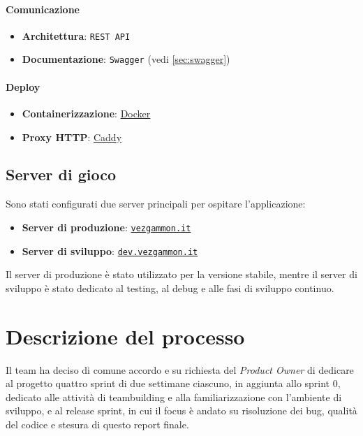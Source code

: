 \documentclass{article}
\begin{document}
\paragraph{Comunicazione}
\begin{itemize}
    \item \textbf{Architettura}: \texttt{REST API}
    \item \textbf{Documentazione}: \texttt{Swagger} (vedi \ref{sec:swagger})
\end{itemize}

\paragraph{Deploy}
\begin{itemize}
    \item \textbf{Containerizzazione}: \href{https://github.com/docker}{Docker}
    \item \textbf{Proxy HTTP}: \href{https://github.com/caddyserver/caddy}{Caddy}
\end{itemize}

\subsection{Server di gioco}

Sono stati configurati due server principali per ospitare l'applicazione:
\begin{itemize}
    \item \textbf{Server di produzione}: \href{https://vezgammon.it}{\texttt{vezgammon.it}}
    \item \textbf{Server di sviluppo}: \href{https://dev.vezgammon.it}{\texttt{dev.vezgammon.it}}
\end{itemize}
Il server di produzione è stato utilizzato per la versione stabile, mentre il server di sviluppo è stato dedicato al testing, 
al debug e alle fasi di sviluppo continuo.

\section{Descrizione del processo}

Il team ha deciso di comune accordo e su richiesta del \textit{Product Owner} di dedicare al progetto quattro sprint di due settimane 
ciascuno, in aggiunta allo sprint 0, dedicato alle attività di teambuilding e alla familiarizzazione con l'ambiente di sviluppo, e 
al release sprint, in cui il focus è andato su risoluzione dei bug, qualità del codice e stesura di questo report finale.
\end{document}
